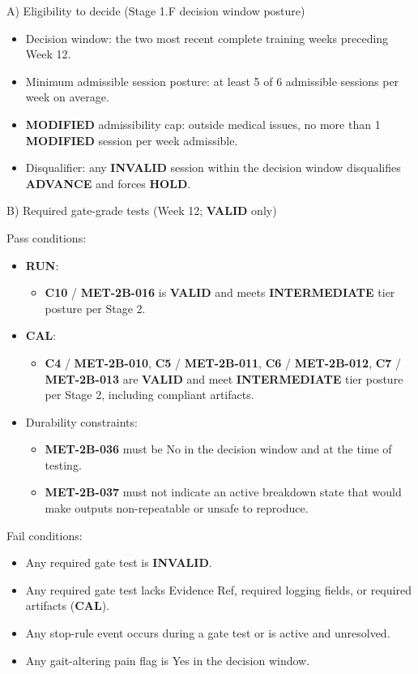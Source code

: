 \documentclass[10pt]{article}
\begin{document}
A) Eligibility to decide (Stage 1.F decision window posture)

\begin{itemize}
\item Decision window: the two most recent complete training weeks preceding Week 12.
\item Minimum admissible session posture: at least 5 of 6 admissible sessions per week on average.
\item \textbf{MODIFIED} admissibility cap: outside medical issues, no more than 1 \textbf{MODIFIED} session per week admissible.
\item Disqualifier: any \textbf{INVALID} session within the decision window disqualifies \textbf{ADVANCE} and forces \textbf{HOLD}.
\end{itemize}

B) Required gate-grade tests (Week 12; \textbf{VALID} only)

Pass conditions:

\begin{itemize}
\item \textbf{RUN}:
  \begin{itemize}
  \item \textbf{C10} / \textbf{MET-2B-016} is \textbf{VALID} and meets \textbf{INTERMEDIATE} tier posture per Stage 2.
  \end{itemize}
\item \textbf{CAL}:
  \begin{itemize}
  \item \textbf{C4} / \textbf{MET-2B-010}, \textbf{C5} / \textbf{MET-2B-011}, \textbf{C6} / \textbf{MET-2B-012}, \textbf{C7} / \textbf{MET-2B-013} are \textbf{VALID} and meet \textbf{INTERMEDIATE} tier posture per Stage 2, including compliant artifacts.
  \end{itemize}
\item Durability constraints:
  \begin{itemize}
  \item \textbf{MET-2B-036} must be No in the decision window and at the time of testing.
  \item \textbf{MET-2B-037} must not indicate an active breakdown state that would make outputs non-repeatable or unsafe to reproduce.
  \end{itemize}
\end{itemize}

Fail conditions:

\begin{itemize}
\item Any required gate test is \textbf{INVALID}.
\item Any required gate test lacks Evidence Ref, required logging fields, or required artifacts (\textbf{CAL}).
\item Any stop-rule event occurs during a gate test or is active and unresolved.
\item Any gait-altering pain flag is Yes in the decision window.
\end{itemize}
\end{document}

